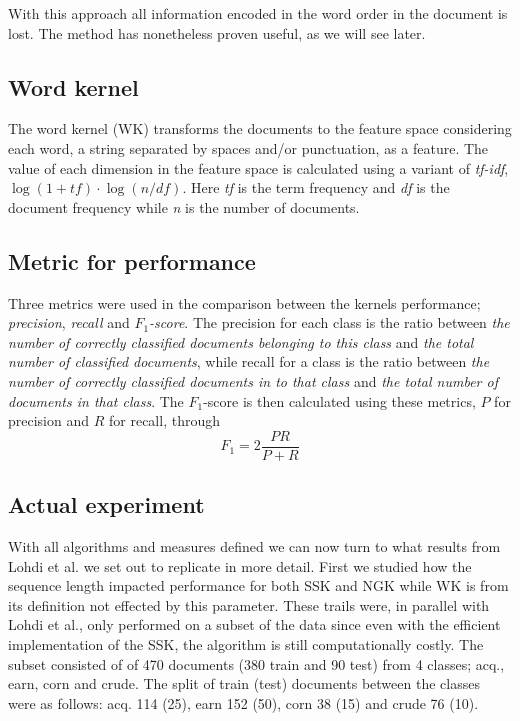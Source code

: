 With this approach all information encoded in the word order in the document is lost. The method has nonetheless proven useful, as we will see later.

\subsection{Word kernel}
The word kernel (WK) transforms the documents to the feature space considering each word, a string separated by spaces and/or punctuation, as a feature. The value of each dimension in the feature space is calculated using a variant of \textit{tf-idf}, $ \log(1+tf) \cdot \log(n/df) $. Here \textit{tf} is the term frequency and \textit{df} is the document frequency while \textit{n} is the number of documents. 


\subsection{Metric for performance}
Three metrics were used in the comparison between the kernels performance; \textit{precision}, \textit{recall} and \textit{$ F_1 $-score}. The precision for each class is the ratio between \textit{the number of correctly classified documents belonging to this class} and \textit{the total number of classified documents}, while recall for a class is the ratio between \textit{the number of correctly classified documents in to that class} and \textit{the total number of documents in that class}. The $ F_1 $-score is then calculated using these metrics, $ P $ for precision and $ R $ for recall,  through 
\begin{equation*}\label{key}
F_1 = 2\dfrac{PR}{P+R}
\end{equation*}

\subsection{Actual experiment}
With all algorithms and measures defined we can now turn to what results from Lohdi et al. we set out to replicate in more detail. First we studied how the sequence length impacted performance for both SSK and NGK while WK is from its definition not effected by this parameter. These trails were, in parallel with Lohdi et al., only performed on a subset of the data since even with the efficient implementation of the SSK, the algorithm is still computationally costly. The subset consisted of of 470 documents (380 train and 90 test) from  4 classes; acq., earn, corn and crude. The split of train (test) documents between the classes were as follows: acq. 114 (25), earn 152 (50), corn 38 (15) and crude 76 (10).

